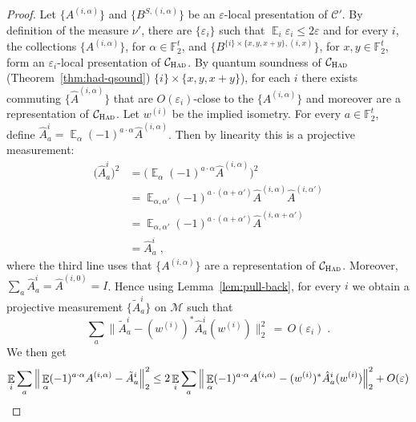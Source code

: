 \documentclass[11pt]{article}
\theoremstyle{definition}
\newcommand{\code}{\mathcal{C}}
\newcommand{\Id}{\ensuremath{I}}
\DeclareMathOperator*{\Expectation}{\mathbb{E}}
\newcommand{\Es}[1]{\Expectation_{#1}}
\newcommand{\F}{\ensuremath{\mathbb{F}}}
\newcommand{\cM}{\ensuremath{\mathcal{M}}}
\newcommand{\Had}{\ensuremath{\textsc{Had}}}
\newcommand{\eps}{\varepsilon}
\begin{document}
\begin{proof}
Let $\{A^{(i,\alpha)}\}$ and $\{B^{S,(i,\alpha)}\}$ be an $\eps$-local presentation of $\code'$. By definition of the measure $\nu'$, there are $\{\eps_i\}$ such that $\Es{i} \eps_i \leq 2\eps$ and for every $i$, the collections $\{A^{(i,\alpha)}\}$, for $\alpha \in \F_2^t$, and $\{B^{\{i\}\times \{x,y,x+y\},(i,x)}\}$, for $x,y\in\F_2^t$, form an $\eps_i$-local presentation of $\code_\Had$. By quantum soundness of $\code_\Had$ (Theorem~\ref{thm:had-qsound}) $\{i\}\times\{x,y,x+y\}$), for each $i$ there exists commuting $\{\hat{A}^{(i,\alpha)}\}$ that are $O(\eps_i)$-close to the $\{A^{(i,\alpha)}\}$ and moreover are a representation of $\code_{\Had}$. Let $w^{(i)}$ be the implied isometry. For every $a\in \F_2^t$, define $\hat{A}^{i}_{a}=\Es{\alpha}(-1)^{a\cdot \alpha} \hat{A}^{(i,\alpha)}$. Then by linearity this is a projective measurement:
\begin{align*}
\big(\hat{A}^{i}_{a}\big)^2 &=\Big(\Es{\alpha}(-1)^{a\cdot \alpha} \hat{A}^{(i,\alpha)}\Big)^2\\
&= \Es{\alpha,\alpha' }(-1)^{a\cdot (\alpha+\alpha')} \hat{A}^{(i,\alpha)}\hat{A}^{(i,\alpha')}\\
&=\Es{\alpha,\alpha' }(-1)^{a\cdot (\alpha+\alpha')} \hat{A}^{(i,\alpha+\alpha')}\\
&=\hat{A}^{i}_{a}\;,
\end{align*}
where the third line uses that  $\{A^{(i,\alpha)}\}$ are a representation of $\code_{\Had}$. Moreover, $\sum_a \hat{A}^{i}_{a} = \hat{A}^{(i,0)}=\Id$. Hence using Lemma~\ref{lem:pull-back}, for every $i$ we obtain a projective measurement $\{\tilde{A}^{i}_{a}\}$ on $\cM$ such that
\begin{equation}\label{eq:qto2-1a}
 \sum_a \big\| \tilde{A}^i_a - (w^{(i)})^* \hat{A}^i_a (w^{(i)}) \big\|_2^2 \,=\, O(\eps_i)\;.
\end{equation}
We then get
\begin{align}
 \Es{i} \sum_a \Big\| \Es{\alpha} (-1)^{a\cdot \alpha} A^{(i,\alpha)} -  \tilde{A}^i_a \Big\|_2^2 
&\leq  2\Es{i} \sum_a \Big\| \Es{\alpha} (-1)^{a\cdot \alpha} A^{(i,\alpha)} -  (w^{(i)})^* \hat{A}^i_a (w^{(i)}) \Big\|_2^2 + O(\eps)\notag\\

\end{align}
\end{proof}
\end{document}
